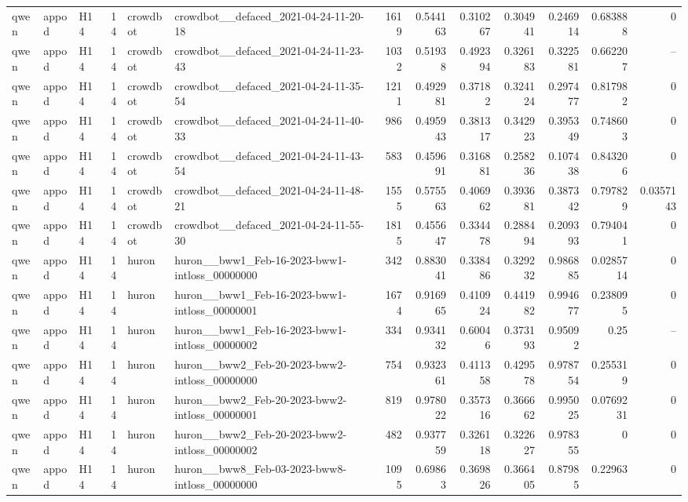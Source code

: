 \begin{longtable}{lllrllrrrrrrr}
qwen & appod & H14 & 14 & crowdbot & crowdbot\_\_defaced\_2021-04-24-11-20-18 & 1619 & 0.544163 & 0.310267 & 0.304941 & 0.246914 & 0.683888 & 0 \\
qwen & appod & H14 & 14 & crowdbot & crowdbot\_\_defaced\_2021-04-24-11-23-43 & 1032 & 0.51938 & 0.492394 & 0.326183 & 0.322581 & 0.662207 & -- \\
qwen & appod & H14 & 14 & crowdbot & crowdbot\_\_defaced\_2021-04-24-11-35-54 & 1211 & 0.492981 & 0.37182 & 0.324124 & 0.297477 & 0.817982 & 0 \\
qwen & appod & H14 & 14 & crowdbot & crowdbot\_\_defaced\_2021-04-24-11-40-33 & 986 & 0.495943 & 0.381317 & 0.342923 & 0.395349 & 0.748603 & 0 \\
qwen & appod & H14 & 14 & crowdbot & crowdbot\_\_defaced\_2021-04-24-11-43-54 & 583 & 0.459691 & 0.316881 & 0.258236 & 0.107438 & 0.843206 & 0 \\
qwen & appod & H14 & 14 & crowdbot & crowdbot\_\_defaced\_2021-04-24-11-48-21 & 1555 & 0.575563 & 0.406962 & 0.393681 & 0.387342 & 0.797829 & 0.0357143 \\
qwen & appod & H14 & 14 & crowdbot & crowdbot\_\_defaced\_2021-04-24-11-55-30 & 1815 & 0.455647 & 0.334478 & 0.288494 & 0.209393 & 0.794041 & 0 \\
qwen & appod & H14 & 14 & huron & huron\_\_bww1\_Feb-16-2023-bww1-intloss\_00000000 & 342 & 0.883041 & 0.338486 & 0.329232 & 0.986885 & 0.0285714 & 0 \\
qwen & appod & H14 & 14 & huron & huron\_\_bww1\_Feb-16-2023-bww1-intloss\_00000001 & 1674 & 0.916965 & 0.410924 & 0.441982 & 0.994677 & 0.238095 & 0 \\
qwen & appod & H14 & 14 & huron & huron\_\_bww1\_Feb-16-2023-bww1-intloss\_00000002 & 334 & 0.934132 & 0.60046 & 0.373193 & 0.95092 & 0.25 & -- \\
qwen & appod & H14 & 14 & huron & huron\_\_bww2\_Feb-20-2023-bww2-intloss\_00000000 & 754 & 0.932361 & 0.411358 & 0.429578 & 0.978754 & 0.255319 & 0 \\
qwen & appod & H14 & 14 & huron & huron\_\_bww2\_Feb-20-2023-bww2-intloss\_00000001 & 819 & 0.978022 & 0.357316 & 0.366662 & 0.995025 & 0.0769231 & 0 \\
qwen & appod & H14 & 14 & huron & huron\_\_bww2\_Feb-20-2023-bww2-intloss\_00000002 & 482 & 0.937759 & 0.326118 & 0.322627 & 0.978355 & 0 & 0 \\
qwen & appod & H14 & 14 & huron & huron\_\_bww8\_Feb-03-2023-bww8-intloss\_00000000 & 1095 & 0.69863 & 0.369826 & 0.366405 & 0.87985 & 0.22963 & 0 \\

\end{longtable}
